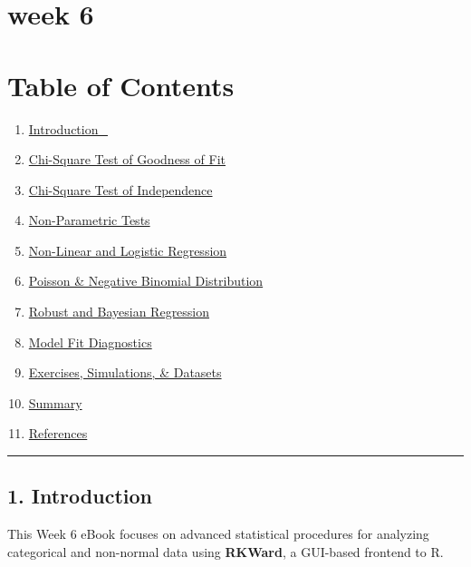 \documentclass[
  letterpaper,
  DIV=11,
  numbers=noendperiod]{scrreprt}
\providecommand{\tightlist}{%
  \setlength{\itemsep}{0pt}\setlength{\parskip}{0pt}}
\begin{document}
\chapter{week 6}\label{week-6}


\chapter{Table of Contents}\label{table-of-contents}

\begin{enumerate}
\def\labelenumi{\arabic{enumi}.}
\tightlist
\item
  \hyperref[introduction_]{Introduction\_}
\item
  \hyperref[chi-square-test-of-goodness-of-fit]{Chi-Square Test of
  Goodness of Fit}
\item
  \hyperref[chi-square-test-of-independence]{Chi-Square Test of
  Independence}
\item
  \hyperref[non-parametric-tests]{Non-Parametric Tests}
\item
  \hyperref[non-linear-and-logistic-regression]{Non-Linear and Logistic
  Regression}
\item
  \hyperref[poisson--negative-binomial-distribution]{Poisson \& Negative
  Binomial Distribution}
\item
  \hyperref[robust-and-bayesian-regression]{Robust and Bayesian
  Regression}
\item
  \hyperref[model-fit-diagnostics]{Model Fit Diagnostics}
\item
  \hyperref[exercises-simulations--datasets]{Exercises, Simulations, \&
  Datasets}
\item
  \hyperref[summary]{Summary}
\item
  \hyperref[references]{References}
\end{enumerate}

\begin{center}\rule{0.5\linewidth}{0.5pt}\end{center}

\section{1. Introduction}\label{introduction-5}

This Week 6 eBook focuses on advanced statistical procedures for
analyzing categorical and non-normal data using \textbf{RKWard}, a
GUI-based frontend to R.
\end{document}
